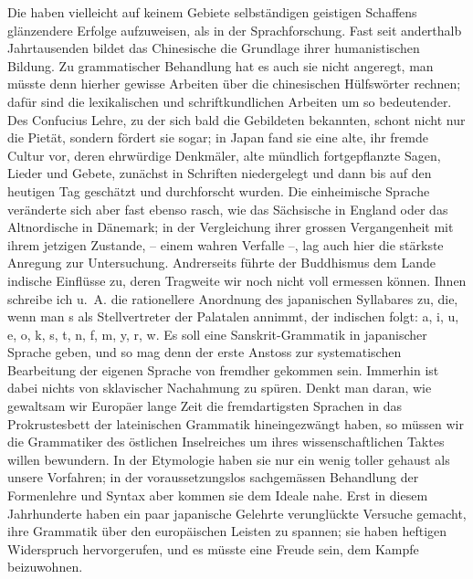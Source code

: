 \label{I.IV.japaner}
\begin{sloppypar}Die  haben vielleicht auf keinem Gebiete selbständigen geistigen Schaffens glänzendere Erfolge aufzuweisen, als in der Sprachforschung. Fast seit anderthalb Jahrtausenden bildet das Chinesische die Grundlage ihrer humanistischen Bildung. Zu grammatischer Behandlung hat es auch sie nicht angeregt, man müsste denn hierher gewisse Arbeiten über die chinesischen Hülfswörter rechnen; dafür sind die lexikalischen und schriftkundlichen Arbeiten um so bedeutender. Des Confucius Lehre, zu der sich bald die Gebildeten bekannten, schont nicht nur die Pietät, sondern fördert sie sogar; in Japan fand sie eine alte, ihr fremde Cultur vor, deren ehrwürdige Denkmäler, alte mündlich fortgepflanzte Sagen, Lieder und Gebete, zunächst in Schriften niedergelegt und dann bis auf den heutigen Tag geschätzt und durchforscht wurden. Die einheimische Sprache veränderte sich aber fast ebenso rasch, wie das Sächsische in England oder das Altnordische in Dänemark; in der Vergleichung ihrer grossen Vergangenheit mit ihrem jetzigen Zustande, – einem wahren Verfalle –, lag auch hier die stärkste Anregung zur Untersuchung. Andrerseits führte der Buddhismus dem Lande indische Einflüsse zu, deren Tragweite wir noch nicht voll ermessen können. Ihnen schreibe ich u.~A. die rationellere Anordnung des japanischen Syllabares zu, die, wenn man s als Stellvertreter der Palatalen annimmt, der indischen folgt: a, i, u, e, o, k, s, t, n, f, m, y, r, w. Es soll eine Sanskrit-Grammatik in japanischer Sprache geben, und so mag denn der erste Anstoss zur systematischen Bearbeitung der eigenen Sprache von \label{fp.24} fremdher gekommen sein. Immerhin ist dabei nichts von sklavischer Nachahmung zu spüren. Denkt man daran, wie gewaltsam wir Europäer lange Zeit die fremdartigsten Sprachen in das Prokrustesbett der lateinischen Grammatik hineingezwängt haben, so müssen wir die Grammatiker des östlichen Inselreiches um ihres wissenschaftlichen Taktes willen bewundern. In der Etymologie haben sie nur ein wenig toller gehaust als unsere Vorfahren; in der voraussetzungslos sachgemässen Behandlung der Formenlehre und Syntax aber kommen sie dem Ideale  nahe. Erst in diesem Jahrhunderte haben ein paar japanische Gelehrte verunglückte Versuche gemacht, ihre Grammatik über den europäischen Leisten zu spannen; sie haben heftigen Widerspruch hervorgerufen, und es müsste eine Freude sein, dem Kampfe beizuwohnen.\end{sloppypar}


